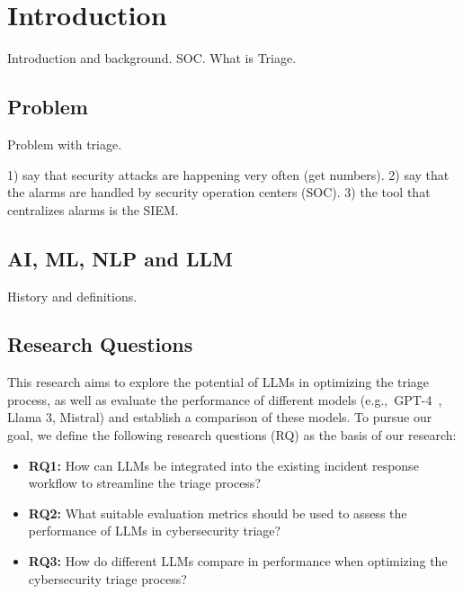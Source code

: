 \section{Introduction}
\label{sec:introduction}

Introduction and background.
SOC\@.
What is Triage.

\subsection{Problem}
\label{subsec:intro-problem}

Problem with triage.

1) say that security attacks are happening very often (get numbers).
2) say that the alarms are handled by security operation centers (SOC).
3) the tool that centralizes alarms is the SIEM\@.

\subsection{AI, ML, NLP and LLM}
\label{subsec:intro-definitions}

History and definitions.

\subsection{Research Questions}
\label{subsec:intro-research-questions}


This research aims to explore the potential of LLMs in optimizing the triage process, as well as evaluate the
performance of different models (e.g.,\ GPT-4\ \citep{achiam2023gpt}, Llama 3, Mistral) and establish a comparison of
these models.
To pursue our goal, we define the following research questions (RQ) as the basis of our research:

\begin{itemize}
    \item \textbf{RQ1:} How can LLMs be integrated into the existing incident response workflow to streamline the triage process?
    \item \textbf{RQ2:} What suitable evaluation metrics should be used to assess the performance of LLMs in cybersecurity triage?
    \item \textbf{RQ3:} How do different LLMs compare in performance when optimizing the cybersecurity triage process?
\end{itemize}
